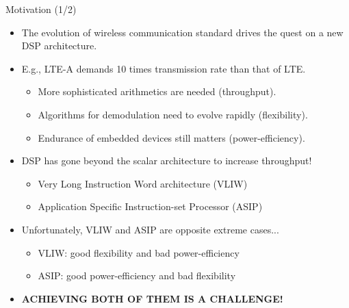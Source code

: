 \documentclass{beamer}
\begin{document}
\begin{CJK}{UTF8}{bkai}
    \begin{frame}{Motivation (1/2)}
        \begin{itemize}
            \item {
                    The evolution of wireless communication standard drives the quest on a new DSP architecture.
                }
            \item {
                    E.g., LTE-A demands 10 times transmission rate than that of LTE.
                    \begin{itemize}
                        \item {
                                More sophisticated arithmetics are needed (throughput).
                            }
                        \item {
                                Algorithms for demodulation need to evolve rapidly (flexibility).
                        }
                        \item {
                                Endurance of embedded devices still matters (power-efficiency).
                        }
                    \end{itemize}
                }
            \item{ 
                    DSP has gone beyond the scalar architecture to increase throughput!
                    \begin{itemize}
                        \item Very Long Instruction Word architecture (VLIW)
                        \item Application Specific Instruction-set Processor (ASIP)
                    \end{itemize}
                }
            \item {
                    Unfortunately, VLIW and ASIP are opposite extreme cases...
                    \begin{itemize}
                        \item VLIW: good flexibility and bad power-efficiency
                        \item ASIP: good power-efficiency and bad flexibility
                    \end{itemize}
                }
            \item \large{\textbf{ACHIEVING BOTH OF THEM IS A CHALLENGE!}}
        \end{itemize}
    \end{frame}


\end{CJK}
\end{document}
